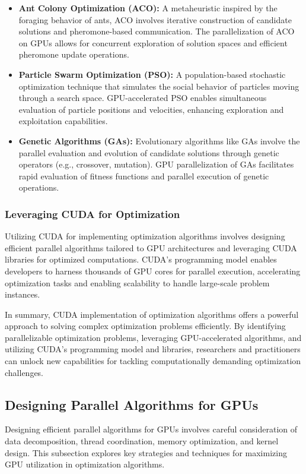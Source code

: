 \documentclass[11pt]{report}
\begin{document}
        \begin{itemize}
            \item \textbf{Ant Colony Optimization (ACO):} A metaheuristic inspired by the foraging behavior of ants, ACO involves iterative construction of candidate solutions and pheromone-based communication. The parallelization of ACO on GPUs allows for concurrent exploration of solution spaces and efficient pheromone update operations.
        
            \item \textbf{Particle Swarm Optimization (PSO):} A population-based stochastic optimization technique that simulates the social behavior of particles moving through a search space. GPU-accelerated PSO enables simultaneous evaluation of particle positions and velocities, enhancing exploration and exploitation capabilities.
        
            \item \textbf{Genetic Algorithms (GAs):} Evolutionary algorithms like GAs involve the parallel evaluation and evolution of candidate solutions through genetic operators (e.g., crossover, mutation). GPU parallelization of GAs facilitates rapid evaluation of fitness functions and parallel execution of genetic operations.
        \end{itemize}
        
        \subsubsection{Leveraging CUDA for Optimization}
        Utilizing CUDA for implementing optimization algorithms involves designing efficient parallel algorithms tailored to GPU architectures and leveraging CUDA libraries for optimized computations. CUDA's programming model enables developers to harness thousands of GPU cores for parallel execution, accelerating optimization tasks and enabling scalability to handle large-scale problem instances.
        
        In summary, CUDA implementation of optimization algorithms offers a powerful approach to solving complex optimization problems efficiently. By identifying parallelizable optimization problems, leveraging GPU-accelerated algorithms, and utilizing CUDA's programming model and libraries, researchers and practitioners can unlock new capabilities for tackling computationally demanding optimization challenges.
        
        \subsection{Designing Parallel Algorithms for GPUs}
        Designing efficient parallel algorithms for GPUs involves careful consideration of data decomposition, thread coordination, memory optimization, and kernel design. This subsection explores key strategies and techniques for maximizing GPU utilization in optimization algorithms.
\end{document}
